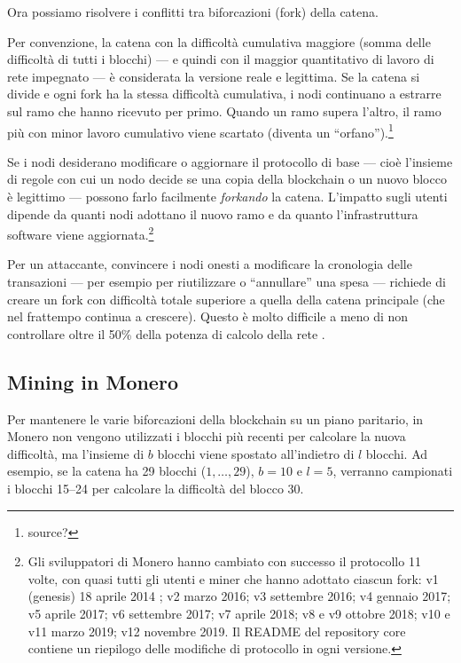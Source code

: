 Ora possiamo risolvere i conflitti tra biforcazioni (fork) della catena.

Per convenzione, la catena con la difficoltà cumulativa maggiore (somma delle difficoltà di tutti i blocchi) — e quindi con il maggior quantitativo di lavoro di rete impegnato — è considerata la versione reale e legittima. Se la catena si divide e ogni fork ha la stessa difficoltà cumulativa, i nodi continuano a estrarre sul ramo che hanno ricevuto per primo. Quando un ramo supera l’altro, il ramo più con minor lavoro cumulativo viene scartato (diventa un “orfano”).\footnote{source?}

Se i nodi desiderano modificare o aggiornare il protocollo di base — cioè l’insieme di regole con cui un nodo decide se una copia della blockchain o un nuovo blocco è legittimo — possono farlo facilmente \emph{forkando} la catena. L’impatto sugli utenti dipende da quanti nodi adottano il nuovo ramo e da quanto l’infrastruttura software viene aggiornata.\footnote{Gli sviluppatori di Monero hanno cambiato con successo il protocollo 11 volte, con quasi tutti gli utenti e miner che hanno adottato ciascun fork: v1 (genesis) 18 aprile 2014 \cite{bitmonero-launched}; v2 marzo 2016; v3 settembre 2016; v4 gennaio 2017; v5 aprile 2017; v6 settembre 2017; v7 aprile 2018; v8 e v9 ottobre 2018; v10 e v11 marzo 2019; v12 novembre 2019. Il README del repository core contiene un riepilogo delle modifiche di protocollo in ogni versione.}

Per un attaccante, convincere i nodi onesti a modificare la cronologia delle transazioni — per esempio per riutilizzare o “annullare” una spesa — richiede di creare un fork con difficoltà totale superiore a quella della catena principale (che nel frattempo continua a crescere). Questo è molto difficile a meno di non controllare oltre il 50\% della potenza di calcolo della rete \cite{Nakamoto_bitcoin}.


\subsection{Mining in Monero} %

Per mantenere le varie biforcazioni della blockchain su un piano paritario, in Monero non vengono utilizzati i blocchi più recenti per calcolare la nuova difficoltà, ma l'insieme di $b$ blocchi viene spostato all'indietro di $l$ blocchi. Ad esempio, se la catena ha 29 blocchi ($1,\dots,29$), $b=10$ e $l=5$, verranno campionati i blocchi 15–24 per calcolare la difficoltà del blocco 30.

